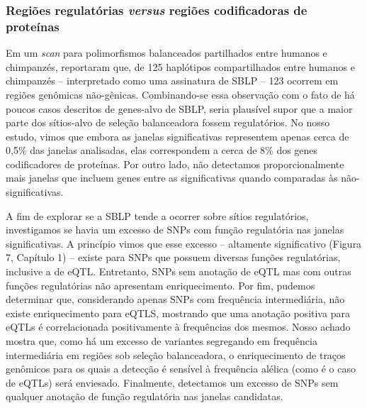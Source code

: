 \begin{refsection}
\subsubsection{Regiões regulatórias \emph{versus} regiões codificadoras de proteínas}

Em um \emph{scan} para polimorfismos balanceados partilhados entre humanos e chimpanzés, \textcite{Leffler2013a} reportaram que, de 125 haplótipos compartilhados entre humanos e chimpanzés -- interpretado como uma assinatura de SBLP -- 123 ocorrem em regiões genômicas não-gênicas. Combinando-se essa observação com o fato de há poucos casos descritos de genes-alvo de SBLP, seria plausível supor que a maior parte dos sítios-alvo de seleção balanceadora fossem regulatórios. No nosso estudo, vimos que embora as janelas significativas representem apenas cerca de 0,5\% das janelas analisadas, elas correspondem a cerca de 8\% dos genes codificadores de proteínas. Por outro lado, não detectamos proporcionalmente mais janelas que incluem genes entre as significativas quando comparadas às não-significativas. 

A fim de explorar se a SBLP tende a ocorrer sobre sítios regulatórios, investigamos se havia um excesso de SNPs com função regulatória nas janelas significativas. A princípio vimos que esse excesso -- altamente significativo (Figura 7, Capítulo 1) -- existe para SNPs que possuem diversas funções regulatórias, inclusive a de eQTL. Entretanto, SNPs sem anotação de eQTL mas com outras funções regulatórias não apresentam enriquecimento. Por fim, pudemos determinar que, considerando apenas SNPs com frequência intermediária, não existe enriquecimento para eQTLS, mostrando que uma anotação positiva para eQTLs é correlacionada positivamente à frequências dos mesmos. Nosso achado mostra que, como há um excesso de variantes segregando em frequência intermediária em regiões sob seleção balanceadora, o enriquecimento de traços genômicos para os quais a detecção é sensível à frequência alélica (como é o caso de eQTLs) será enviesado. Finalmente, detectamos um excesso de SNPs sem qualquer anotação de função regulatória nas janelas candidatas.



\end{refsection}
